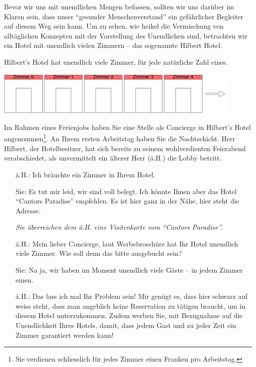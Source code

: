 Bevor wir uns mit unendlichen Mengen befassen, sollten wir uns darüber im Klaren sein, dass unser ``gesunder Menschenverstand'' ein gefährlicher Begleiter auf diesem Weg sein kann. Um zu sehen, wie heikel die Vermischung von alltäglichen Konzepten mit der Vorstellung des Unendlichen sind, betrachten wir ein Hotel mit unendlich vielen Zimmern -- das sogenannte Hilbert Hotel.
\begin{example}
Hilbert's Hotel hat unendlich viele Zimmer, für jede natürliche Zahl eines.
\begin{center}
\begin{framed}
\includegraphics[width=0.9\textwidth]{figures/hilbertHotel}
\end{framed}
\end{center}
Im Rahmen eines Ferienjobs haben Sie eine Stelle als Concierge in Hilbert's Hotel angenommen\footnote{Sie verdienen schliesslich für jedes Zimmer einen Franken pro Arbeitstag.}. An Ihrem ersten Arbeitstag haben Sie die Nachtschicht. Herr Hilbert, der Hotelbesitzer, hat sich bereits zu seinem wohlverdienten Feierabend verabschiedet, als unvermittelt ein älterer Herr (ä.H.) die Lobby betritt.
\begin{itemize}
\item[ä.H.:] Ich bräuchte ein Zimmer in Ihrem Hotel.
\item[Sie:] Es tut mir leid, wir sind voll belegt. Ich könnte Ihnen aber das Hotel ``Cantors Paradise'' empfehlen. Es ist hier ganz in der Nähe, hier steht die Adresse.

\textit{Sie überreichen dem ä.H. eine Visitenkarte vom ``Cantors Paradise''.}
\item[ä.H.:] Mein lieber Concierge, laut Werbebroschüre hat Ihr Hotel unendlich viele Zimmer. Wie soll denn das bitte ausgebucht sein?
\item[Sie:] Na ja, wir haben im Moment unendlich viele Gäste -- in jedem Zimmer einen.
\item[ä.H.:] Das lass ich mal Ihr Problem sein! Mir genügt es, dass hier schwarz auf weiss steht, dass man angeblich keine Reservation zu tätigen braucht, um in diesem Hotel unterzukommen. Zudem werben Sie, mit Bezugnahme auf die Unendlichkeit Ihres Hotels, damit, dass jedem Gast und zu jeder Zeit ein Zimmer garantiert werden kann!


\end{itemize}
\end{example}
